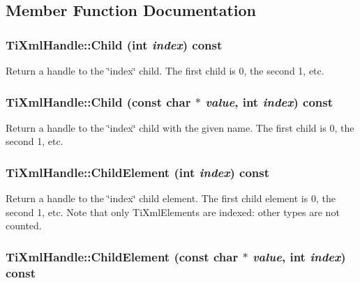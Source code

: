 \subsection{Member Function Documentation}
\hypertarget{class_ti_xml_handle_af9cf6a7d08a5da94a8924425ad0cd5ac}{
\subsubsection[{Child}]{ TiXmlHandle::Child (int {\em index}) const}}
\label{class_ti_xml_handle_af9cf6a7d08a5da94a8924425ad0cd5ac}
Return a handle to the \char`\"{}index\char`\"{} child. The first child is 0, the second 1, etc. \hypertarget{class_ti_xml_handle_a072492b4be1acdb0db2d03cd8f71ccc4}{
\subsubsection[{Child}]{ TiXmlHandle::Child (const char $\ast$ {\em value}, \/  int {\em index}) const}}
\label{class_ti_xml_handle_a072492b4be1acdb0db2d03cd8f71ccc4}
Return a handle to the \char`\"{}index\char`\"{} child with the given name. The first child is 0, the second 1, etc. \hypertarget{class_ti_xml_handle_a8786475b9d1f1518492e3a46704c7ef0}{
\subsubsection[{ChildElement}]{ TiXmlHandle::ChildElement (int {\em index}) const}}
\label{class_ti_xml_handle_a8786475b9d1f1518492e3a46704c7ef0}
Return a handle to the \char`\"{}index\char`\"{} child element. The first child element is 0, the second 1, etc. Note that only TiXmlElements are indexed: other types are not counted. \hypertarget{class_ti_xml_handle_a979a3f850984a176ee884e394c7eed2d}{
\subsubsection[{ChildElement}]{ TiXmlHandle::ChildElement (const char $\ast$ {\em value}, \/  int {\em index}) const}}
